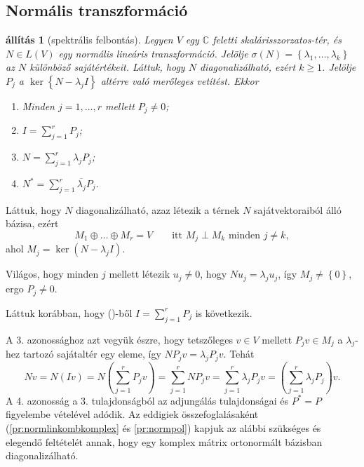 \documentclass[9pt, a4paper, showtrims]{memoir}
\makeatletter
\renewenvironment{proof}[1][\proofname]
    {\par\pushQED{\qed}%
    \normalfont \topsep6\p@\@plus6\p@\relax
    \trivlist
    \item[\hskip\labelsep
        \itshape
    #1\@addpunct{:}]\ignorespaces}
    {\popQED\endtrivlist\@endpefalse}
\theoremstyle{plain}
\newtheorem{proposition}{állítás}[chapter]
\theoremstyle{remark}
\theoremstyle{definition}
\makeatother
\begin{document}
\subsection{Normális transzformáció}
\begin{proposition}[spektrális felbontás]
	Legyen $V$ egy $\mathbb{C}$ feletti skalárisszorzatos-tér, és $N\in L\left( V \right)$
	egy normális lineáris transzformáció.
	Jelölje $\sigma\left( N \right)=\left\{\lambda_1,\ldots,\lambda_k  \right\}$ az $N$ különböző sajátértékeit.
	Láttuk, hogy $N$ diagonalizálható, ezért $k\geq 1$.
	Jelölje $P_j$ a $\ker\left\{ N-\lambda_jI \right\}$ altérre való merőleges vetítést.
	Ekkor
	\begin{enumerate}
		\item Minden $j=1,\ldots,r$ mellett $P_j\neq 0$;
		\item $I=\sum_{j=1}^rP_j$;
		\item $N=\sum_{j=1}^r\lambda_jP_j$;
		\item $N^\ast=\sum_{j=1}^r\overline{\lambda_j}P_j$.
		      \qedhere
	\end{enumerate}
\end{proposition}
\begin{proof}
	Láttuk, hogy $N$ diagonalizálható, azaz létezik a térnek $N$ sajátvektoraiból álló
	bázisa,
	ezért
	\[
		M_1\oplus\dots\oplus M_r=V
		\qquad\text{itt }M_j\perp M_k\text{ minden }j\neq k,\tag{\dag}
	\]
	ahol $M_j=\ker\left( N-\lambda_jI \right)$.

	Világos,
	hogy minden $j$ mellett létezik $u_j\neq 0$, hogy $Nu_j=\lambda_ju_j$,
	így $M_j\neq \left\{ 0 \right\}$,
	ergo $P_j\neq 0.$

	Láttuk korábban, hogy (\dag)-ből $I=\sum_{j=1}^{r}P_j$ is következik.

	A 3. azonossághoz azt vegyük észre,
	hogy tetszőleges $v\in V$ mellett $P_jv\in M_j$ a $\lambda_j$-hez tartozó sajátaltér egy eleme,
	így $NP_jv=\lambda_jP_jv$. Tehát
	\[
		Nv
		=
		N\left( Iv \right)
		=
		N\left( \sum_{j=1}^rP_jv \right)
		=
		\sum_{j=1}^rNP_jv
		=
		\sum_{j=1}^r\lambda_jP_jv
		=
		\left( \sum_{j=1}^r\lambda_jP_j \right)v.
	\]
	A 4. azonosság a 3. tulajdonságból az adjungálás tulajdonságai és $P^\ast=P$ figyelembe vételével adódik.
\end{proof}
Az eddigiek összefoglalásaként (\ref{pr:normlinkombkomplex} és \ref{pr:normpol}) kapjuk az alábbi szükséges és elegendő feltételét annak,
hogy egy komplex mátrix ortonormált bázisban diagonalizálható.
\end{document}

